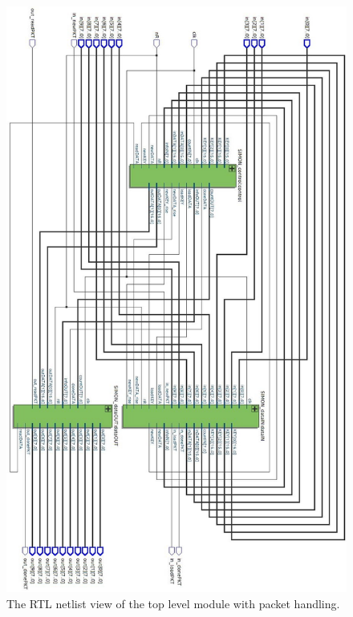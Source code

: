 \documentclass[12pt,twoside,a4paper]{report}
\begin{document}
	\begin{figure}[H]
		\includegraphics[width=0.6\linewidth]{SIMON_synth}
		\centering
		\caption{The RTL netlist view of the top level module with packet handling.}
		\label{fig:synth_final}
	\end{figure}
	
\end{document}
